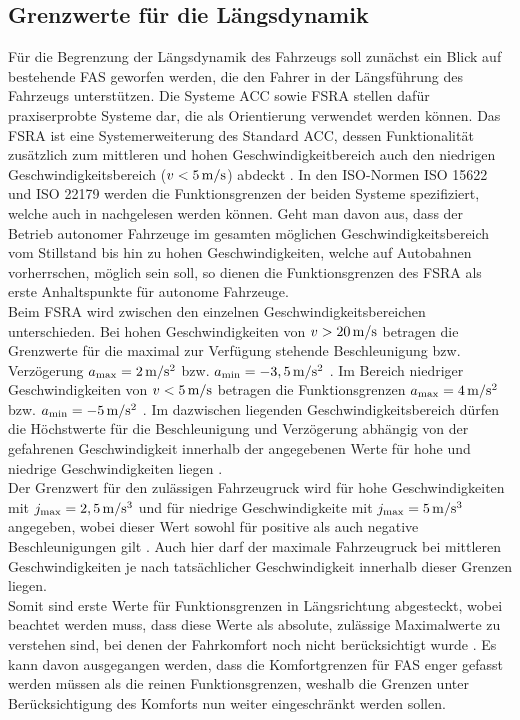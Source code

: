 \subsection{Grenzwerte für die Längsdynamik} 
Für die Begrenzung der Längsdynamik des Fahrzeugs soll zunächst ein Blick auf bestehende \acrshort{FAS} geworfen werden, die den Fahrer in der Längsführung des Fahrzeugs unterstützen. Die Systeme \acrshort{ACC} sowie \acrshort{FSRA} stellen dafür praxiserprobte Systeme dar, die als Orientierung verwendet werden können. Das \acrshort{FSRA} ist eine Systemerweiterung des Standard \acrshort{ACC}, dessen Funktionalität zusätzlich zum mittleren und hohen Geschwindigkeitbereich auch den niedrigen Geschwindigkeitsbereich ($v < 5\,\mathrm{m/s}$) abdeckt \cite{Winner handbuch FAS}\cite{Winner.2009}. In den ISO-Normen ISO 15622 \cite{iso15622} und ISO 22179 \cite{iso22179} werden die Funktionsgrenzen der beiden Systeme spezifiziert, welche auch in \cite{Winner handbuch FAS}\cite{Winner.2009} nachgelesen werden können. Geht man davon aus, dass der Betrieb autonomer Fahrzeuge im gesamten möglichen Geschwindigkeitsbereich vom Stillstand bis hin zu hohen Geschwindigkeiten, welche auf Autobahnen vorherrschen, möglich sein soll, so dienen die Funktionsgrenzen des \acrshort{FSRA} als erste Anhaltspunkte für autonome Fahrzeuge. \\
Beim \acrshort{FSRA} wird zwischen den einzelnen Geschwindigkeitsbereichen unterschieden. Bei hohen Geschwindigkeiten von $v>20\,\mathrm{m/s}$ betragen die Grenzwerte für die maximal zur Verfügung stehende Beschleunigung bzw. Verzögerung $a_{\textrm{max}} = 2\,\mathrm{m/s^2}$ bzw. $a_{\textrm{min}} = -3,5\,\mathrm{m/s^2}$ \cite{Winner handbuch FAS}. Im Bereich niedriger Geschwindigkeiten von $v < 5\,\mathrm{m/s}$ betragen die Funktionsgrenzen $a_{\textrm{max}} = 4\,\mathrm{m/s^2}$ bzw. $a_{\textrm{min}} = -5\,\mathrm{m/s^2}$ \cite{Winner handbuch FAS}. Im dazwischen liegenden Geschwindigkeitsbereich dürfen die Höchstwerte für die Beschleunigung und Verzögerung abhängig von der gefahrenen Geschwindigkeit innerhalb der angegebenen Werte für hohe und niedrige Geschwindigkeiten liegen \cite{Winner handbuch FAS}\cite{Winner.2009}.\\
Der Grenzwert für den zulässigen Fahrzeugruck wird für hohe Geschwindigkeiten mit $j_{\textrm{max}} = 2,5\,\mathrm{m/s^3}$ und für niedrige Geschwindigkeite mit $j_{\textrm{max}} = 5\,\mathrm{m/s^3}$ angegeben, wobei dieser Wert sowohl für positive als auch negative Beschleunigungen gilt \cite{Winner handbuch FAS}\cite{Winner.2009}. Auch hier darf der maximale Fahrzeugruck bei mittleren Geschwindigkeiten je nach tatsächlicher Geschwindigkeit innerhalb dieser Grenzen liegen. \\
Somit sind erste Werte für Funktionsgrenzen in Längsrichtung abgesteckt, wobei beachtet werden muss, dass diese Werte als absolute, zulässige Maximalwerte zu verstehen sind, bei denen der Fahrkomfort noch nicht berücksichtigt wurde \cite{Festner.2019}. Es kann davon ausgegangen werden, dass die Komfortgrenzen für \acrshort{FAS} enger gefasst werden müssen als die reinen Funktionsgrenzen, weshalb die Grenzen unter Berücksichtigung des Komforts nun weiter eingeschränkt werden sollen.

